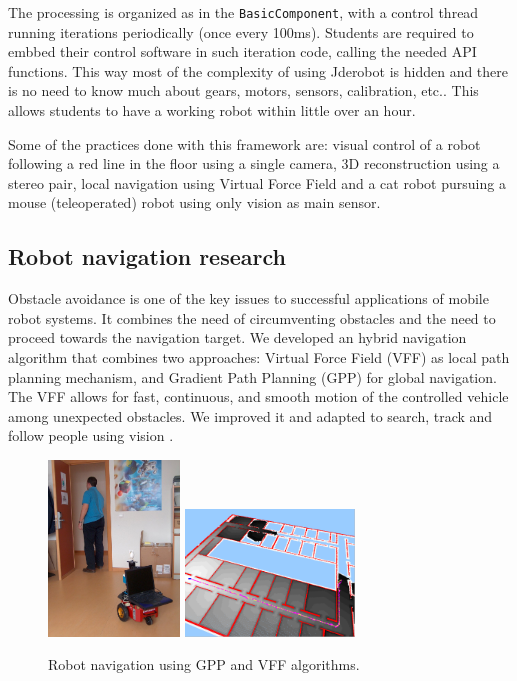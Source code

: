 \documentclass[twocolumn]{svjour3}          %
\begin{document}
The processing is organized as in the \texttt{BasicComponent}, with a control thread running iterations periodically (once every 100ms). Students are required to embbed their control software in such iteration code, calling the needed API functions. This way most of the complexity of using Jderobot is hidden and there is no need to know much about gears, motors, sensors, calibration, etc.. This allows students to have a working robot within little over an hour. 

Some of the practices done with this framework are: visual control of a robot following a red line in the floor using a single camera, 3D reconstruction using a stereo pair, local navigation using Virtual Force Field and a cat robot pursuing a mouse (teleoperated) robot using only vision as main sensor.

\subsection{Robot navigation research}

Obstacle avoidance is one of the key issues to successful applications of mobile robot systems. It combines the need of circumventing obstacles and the need to proceed towards the navigation target. We developed an hybrid navigation algorithm that combines two approaches: Virtual Force Field (VFF) as local path planning mechanism, and Gradient Path Planning (GPP) for global navigation. The VFF allows for fast, continuous, and smooth motion of the controlled vehicle among unexpected obstacles. We improved it and adapted to search, track and follow people using vision \cite{canas05d}. 

\begin{figure}[h!]
  \includegraphics[width=3.5cm]{moriles_sigue_persona.jpg}
 \includegraphics[width=4.5cm]{gppNav.png}
\caption{Robot navigation using GPP and VFF algorithms.}
\label{fig:gppNav}
\end{figure}
\end{document}

